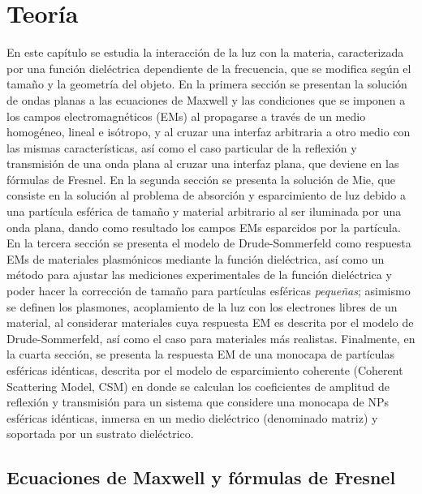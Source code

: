 \chapter{Teoría}

 En este capítulo se estudia la interacción de la luz con la materia, caracterizada por una función dieléctrica dependiente de la frecuencia, que se modifica según el tamaño y la geometría del objeto. En la primera sección se presentan la  solución de ondas planas a las ecuaciones de Maxwell y las condiciones que se imponen a los campos electromagnéticos (EMs) al propagarse a través de un medio homogéneo, lineal e isótropo, y al cruzar una interfaz arbitraria a otro medio con las mismas características, así como el caso particular de la reflexión y transmisión de una onda plana al cruzar una interfaz plana, que deviene en las fórmulas de Fresnel. En la segunda sección se presenta la solución de Mie, que consiste en la solución al problema de absorción y esparcimiento de luz debido a una partícula esférica de tamaño y material arbitrario al ser iluminada por una onda plana, dando como resultado los campos EMs esparcidos por la partícula. En la tercera sección se presenta el modelo de Drude-Sommerfeld como respuesta EMs de materiales plasmónicos mediante la función dieléctrica, así como un método para ajustar las mediciones experimentales de la función dieléctrica y poder hacer la corrección de tamaño para partículas esféricas \emph{pequeñas}; asimismo se definen los plasmones, acoplamiento de la luz con los electrones libres de un material, al considerar materiales cuya respuesta EM es descrita por el modelo de Drude-Sommerfeld, así como el caso para materiales más realistas. Finalmente, en la cuarta sección, se presenta la respuesta EM de una monocapa de partículas esféricas idénticas, descrita por el modelo de esparcimiento coherente (Coherent Scattering Model, CSM) en donde se calculan los coeficientes de amplitud de reflexión y transmisión para un sistema que considere una monocapa de NPs esféricas idénticas, inmersa en un medio dieléctrico (denominado matriz) y soportada por un sustrato dieléctrico.

\section{Ecuaciones de Maxwell y fórmulas de Fresnel}

